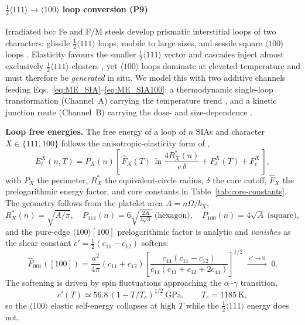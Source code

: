 \paragraph{$\tfrac12\langle111\rangle\!\to\!\langle100\rangle$ loop conversion (P9)}
\label{sec:loop-conversion}
Irradiated bcc Fe and F/M steels develop prismatic interstitial loops of two
characters: glissile $\tfrac12\langle111\rangle$ loops, mobile to large sizes,
and sessile square $\langle100\rangle$ loops
\citep{Masters1965,EyreBartlett1965}. Elasticity favours the smaller
$\tfrac12\langle111\rangle$ vector and cascades inject almost exclusively
$\tfrac12\langle111\rangle$ clusters \citep{Marian2002}, yet $\langle100\rangle$
loops dominate at elevated temperature and must therefore be \emph{generated}
in situ. We model this with two additive channels feeding
Eqs.~\eqref{eq:ME_SIA}--\eqref{eq:ME_SIA100}: a thermodynamic single-loop
transformation (Channel~A) carrying the temperature trend \citep{Dudarev2008},
and a kinetic junction route (Channel~B) carrying the dose- and
size-dependence \citep{Marian2002,Arakawa2006}.

\textbf{Loop free energies.}
\label{sec:loop-energies}
The free energy of a loop of $n$ SIAs and character $X\in\{111,100\}$ follows
the anisotropic-elasticity form of \cite{Dudarev2008},
\begin{equation}
  E_l^{X}(n,T) = P_X(n)\!\left[\,
    \hat F_X(T)\,\ln\!\frac{4R^\ast_X(n)}{e\,\delta}
    + F_\delta^{X}(T) + F_c^{X}\,\right],
  \label{eq:loop-energy}
\end{equation}
with $P_X$ the perimeter, $R^\ast_X$ the equivalent-circle radius, $\delta$ the
core cutoff, $\hat F_X$ the prelogarithmic energy factor, and core constants in
Table~\ref{tab:core-constants}. The geometry follows from the platelet area
$A=n\Omega/b_X$,
\begin{equation}
  R^\ast_X(n)=\sqrt{A/\pi},\quad
  P_{111}(n)=6\sqrt{\tfrac{2A}{3\sqrt3}}\ \text{(hexagon)},\quad
  P_{100}(n)=4\sqrt{A}\ \text{(square)},
  \label{eq:loop-geometry}
\end{equation}
and the pure-edge $\langle100\rangle[100]$ prelogarithmic factor is analytic and
\emph{vanishes} as the shear constant $c'=\tfrac12(c_{11}-c_{12})$ softens:
\begin{equation}
  \hat F_{001}([100]) = \frac{a^2}{4\pi}(c_{11}{+}c_{12})
  \!\left[\frac{c_{44}(c_{11}{-}c_{12})}{c_{11}(c_{11}{+}c_{12}{+}2c_{44})}\right]^{1/2}
  \;\xrightarrow{\;c'\to0\;}\;0.
  \label{eq:F100}
\end{equation}
The softening is driven by spin fluctuations approaching the $\alpha$--$\gamma$
transition,
\begin{equation}
  c'(T)\simeq 56.8\,(1-T/T_c)^{1/2}\ \text{GPa},\qquad T_c=1185\ \text{K},
  \label{eq:cprime}
\end{equation}
so the $\langle100\rangle$ elastic self-energy collapses at high $T$ while the
$\tfrac12\langle111\rangle$ energy does not.

